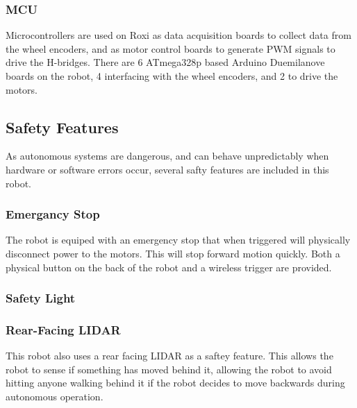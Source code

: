 \subsubsection{MCU}

Microcontrollers are used on Roxi as data acquisition boards to collect data from the wheel encoders, and as motor control boards to generate PWM signals to drive the H-bridges. There are 6 ATmega328p based Arduino Duemilanove boards on the robot, 4 interfacing with the wheel encoders, and 2 to drive the motors.

\subsection{Safety Features}

As autonomous systems are dangerous, and can behave unpredictably when hardware or software errors occur, several safty features are included in this robot.

\subsubsection{Emergancy Stop}

The robot is equiped with an emergency stop that when triggered will physically disconnect power to the motors. This will stop forward motion quickly. Both a physical button on the back of the robot and a wireless trigger are provided.

\subsubsection{Safety Light}



\subsubsection{Rear-Facing LIDAR}

This robot also uses a rear facing LIDAR as a saftey feature. This allows the robot to sense if something has moved behind it, allowing the robot to avoid hitting anyone walking behind it if the robot decides to move backwards during autonomous operation.

